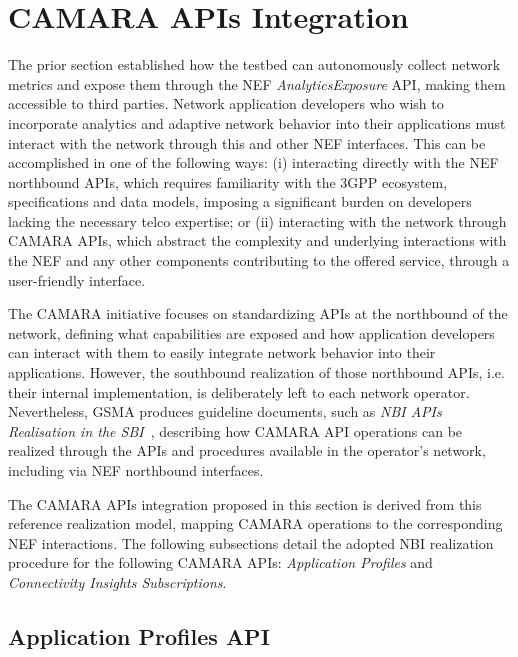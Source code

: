 \section{CAMARA \acsp{API} Integration}
\label{chap:proposal:camara}

The prior section established how the testbed can autonomously collect network metrics and expose them through the \acs{NEF} \textit{AnalyticsExposure} \acs{API}, making them accessible to third parties. Network application developers who wish to incorporate analytics and adaptive network behavior into their applications must interact with the network through this and other \acs{NEF} interfaces. This can be accomplished in one of the following ways: (i) interacting directly with the \acs{NEF} northbound \acsp{API}, which requires familiarity with the \acs{3GPP} ecosystem, specifications and data models, imposing a significant burden on developers lacking the necessary telco expertise; or (ii) interacting with the network through CAMARA \acsp{API}, which abstract the complexity and underlying interactions with the \acs{NEF} and any other components contributing to the offered service, through a user-friendly interface.

The CAMARA initiative focuses on standardizing \acsp{API} at the northbound of the network, defining what capabilities are exposed and how application developers can interact with them to easily integrate network behavior into their applications. However, the southbound realization of those northbound \acsp{API}, i.e. their internal implementation, is deliberately left to each network operator. Nevertheless, \acs{GSMA} produces guideline documents, such as \textit{\acs{NBI} \acsp{API} Realisation in the \acs{SBI}}~\cite{gsmaNbiRealization}, describing how CAMARA \acs{API} operations can be realized through the \acsp{API} and procedures available in the operator's network, including via \acs{NEF} northbound interfaces.

The CAMARA \acsp{API} integration proposed in this section is derived from this reference realization model, mapping CAMARA operations to the corresponding \acs{NEF} interactions. The following subsections detail the adopted \acs{NBI} realization procedure for the following CAMARA \acsp{API}: \textit{Application Profiles} and \textit{Connectivity Insights Subscriptions}.

\subsection{Application Profiles \acs{API}}

